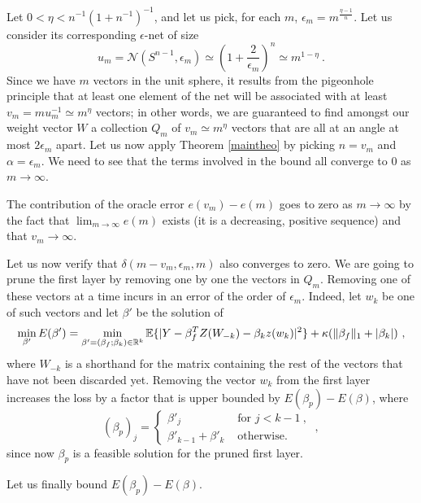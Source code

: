 Let $0< \eta < n^{-1} ( 1 + n^{-1})^{-1}$, and let us pick, for each $m$, $\epsilon_m = m^{\frac{\eta-1}{n} }$. 
Let us consider its corresponding $\epsilon$-net of size 
$$u_m = \mathcal{N}(S^{n-1}, \epsilon_m) \simeq \left( 1 + \frac{2}{\epsilon_m} \right)^n \simeq m^{1-\eta} ~.$$
Since we have $m$ vectors in the unit sphere, it results from the pigeonhole principle that at least one 
element of the net will be associated with at least $v_m = m u_m^{-1} \simeq m^{\eta}$ vectors; in other words, 
we are guaranteed to find amongst our weight vector $W$ a collection $Q_m$ of $v_m \simeq m^\eta$ vectors that are all 
at an angle at most $2\epsilon_m$ apart. 
Let us now apply Theorem \ref{maintheo} by picking $n=v_m$ and $\alpha = \epsilon_m$. 
We need to see that the terms involved in the bound all converge to $0$ as $m \to \infty$. 

The contribution of the oracle error $e(v_m) - e(m)$ goes to zero as $m\to \infty$ by the 
fact that $\lim_{m \to \infty} e(m)$ exists (it is a decreasing, positive sequence) and that $v_m \to \infty$.

Let us now verify that $\delta(m - v_m, \epsilon_m, m)$ also converges to zero.
We are going to prune the first layer by removing one by one the vectors in $Q_m$.
Removing one of these vectors at a time incurs in an error of the order of $\epsilon_m$. 
Indeed, let $w_k$ be one of such vectors and let $\beta'$ be the solution of 
$$\min_{\beta'} E(\beta') = \min_{\beta'=(\beta_f;\beta_k) \in {\mathbb{R}}^{k}} {\mathbb{E}} \{ |Y - \beta_f^T Z(W_{-k}) - \beta_k z(w_k)|^2 \} + \kappa ( \| \beta_f \|_1 + |\beta_k| )~, $$
where $W_{-k}$ is a shorthand for the matrix containing the rest of the vectors that have not been discarded yet.
  Removing the vector $w_k$ from the first layer
 increases the loss by a factor that is upper bounded by $E(\beta_p) - E(\beta)$, where 
$$(\beta_p)_j = \left\{
\begin{array}{rl}
 \beta'_j  & \text{ for  } j < k -1 ~,\\
 \beta'_{k-1} + \beta'_{k } & \text{ otherwise.}
\end{array}\right.~, $$
 since now $\beta_p$ is a feasible solution for the pruned first layer.

Let us finally bound $E(\beta_p) - E(\beta)$. 

